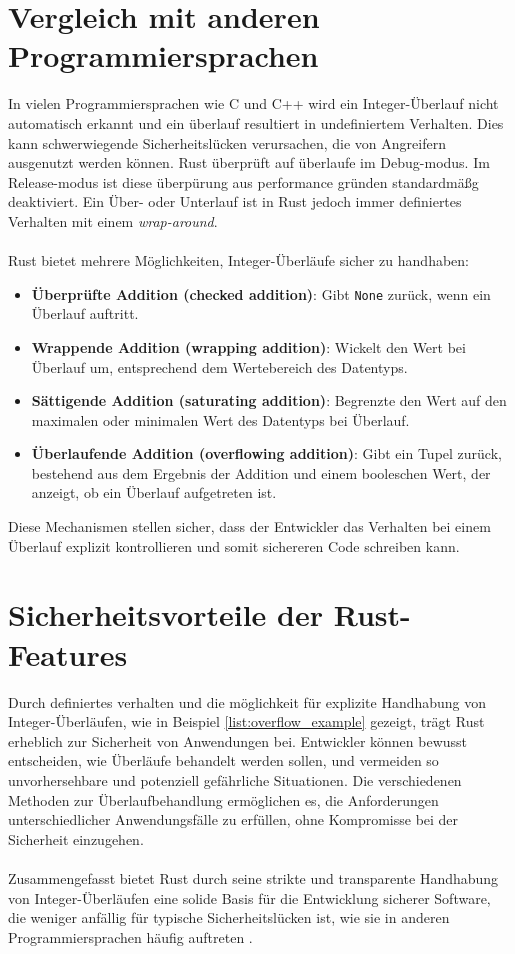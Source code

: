 \section{Vergleich mit anderen Programmiersprachen}

In vielen Programmiersprachen wie C und C++ wird ein Integer-Überlauf nicht automatisch erkannt und ein überlauf resultiert in undefiniertem Verhalten. 
Dies kann schwerwiegende Sicherheitslücken verursachen, die von Angreifern ausgenutzt werden können.
Rust überprüft auf überlaufe im Debug-modus.
Im Release-modus ist diese überpürung aus performance gründen standardmäßg deaktiviert.
Ein Über- oder Unterlauf ist in Rust jedoch immer definiertes Verhalten mit einem \textit{\gls{wrap-around}}.\\
\\
Rust bietet mehrere Möglichkeiten, Integer-Überläufe sicher zu handhaben:

\begin{itemize}
    \item \textbf{Überprüfte Addition (checked addition)}: Gibt \texttt{None} zurück, wenn ein Überlauf auftritt.
    \item \textbf{Wrappende Addition (wrapping addition)}: Wickelt den Wert bei Überlauf um, entsprechend dem Wertebereich des Datentyps.
    \item \textbf{Sättigende Addition (saturating addition)}: Begrenzte den Wert auf den maximalen oder minimalen Wert des Datentyps bei Überlauf.
    \item \textbf{Überlaufende Addition (overflowing addition)}: Gibt ein Tupel zurück, bestehend aus dem Ergebnis der Addition und einem booleschen Wert, der anzeigt, ob ein Überlauf aufgetreten ist.
\end{itemize}
\noindent
Diese Mechanismen stellen sicher, dass der Entwickler das Verhalten bei einem Überlauf explizit kontrollieren und somit sichereren Code schreiben kann.

\section{Sicherheitsvorteile der Rust-Features}

Durch definiertes verhalten und die möglichkeit für explizite Handhabung von Integer-Überläufen, wie in Beispiel \ref{list:overflow_example} gezeigt, trägt Rust erheblich zur Sicherheit von Anwendungen bei. 
Entwickler können bewusst entscheiden, wie Überläufe behandelt werden sollen, und vermeiden so unvorhersehbare und potenziell gefährliche Situationen. 
Die verschiedenen Methoden zur Überlaufbehandlung ermöglichen es, die Anforderungen unterschiedlicher Anwendungsfälle zu erfüllen, ohne Kompromisse bei der Sicherheit einzugehen.\\
\\
Zusammengefasst bietet Rust durch seine strikte und transparente Handhabung von Integer-Überläufen eine solide Basis für die Entwicklung sicherer Software, die weniger anfällig für typische Sicherheitslücken ist, wie sie in anderen Programmiersprachen häufig auftreten \cite{tung2020}.

